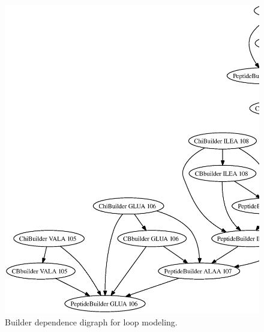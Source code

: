 \documentclass{article}[14pts]
\begin{document}
\begin{figure}
\includegraphics[width=6in,angle=90]{digraph.ps}
\caption{Builder dependence digraph for loop modeling.}
\label{loop-digraph}
\end{figure}
\end{document}
